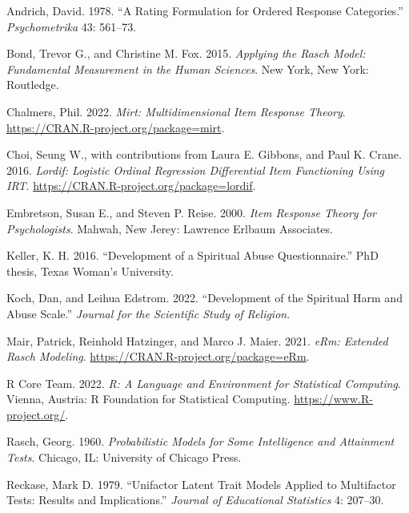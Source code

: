 \documentclass[
  letterpaper,
  DIV=11,
  numbers=noendperiod]{scrreport}
\newlength{\cslhangindent}
\newlength{\cslentryspacingunit} %
\newenvironment{CSLReferences}[2] %
 {%
  \setlength{\parindent}{0pt}
  \ifodd #1
  \let\oldpar\par
  \def\par{\hangindent=\cslhangindent\oldpar}
  \fi
  \setlength{\parskip}{#2\cslentryspacingunit}
 }%
 {}
\begin{document}
\hypertarget{refs}{}
\begin{CSLReferences}{1}{0}
\leavevmode{}%
Andrich, David. 1978. {``A Rating Formulation for Ordered Response
Categories.''} \emph{Psychometrika} 43: 561--73.

\leavevmode{}%
Bond, Trevor G., and Christine M. Fox. 2015. \emph{Applying the Rasch
Model: Fundamental Measurement in the Human Sciences}. New York, New
York: Routledge.

\leavevmode{}%
Chalmers, Phil. 2022. \emph{Mirt: Multidimensional Item Response
Theory}. \url{https://CRAN.R-project.org/package=mirt}.

\leavevmode{}%
Choi, Seung W., with contributions from Laura E. Gibbons, and Paul K.
Crane. 2016. \emph{Lordif: Logistic Ordinal Regression Differential Item
Functioning Using IRT}. \url{https://CRAN.R-project.org/package=lordif}.

\leavevmode{}%
Embretson, Susan E., and Steven P. Reise. 2000. \emph{Item Response
Theory for Psychologists}. Mahwah, New Jerey: Lawrence Erlbaum
Associates.

\leavevmode{}%
Keller, K. H. 2016. {``Development of a Spiritual Abuse
Questionnaire.''} PhD thesis, Texas Woman's University.

\leavevmode{}%
Koch, Dan, and Leihua Edstrom. 2022. {``Development of the Spiritual
Harm and Abuse Scale.''} \emph{Journal for the Scientific Study of
Religion}.

\leavevmode{}%
Mair, Patrick, Reinhold Hatzinger, and Marco J. Maier. 2021. \emph{eRm:
Extended Rasch Modeling}. \url{https://CRAN.R-project.org/package=eRm}.

\leavevmode{}%
R Core Team. 2022. \emph{R: A Language and Environment for Statistical
Computing}. Vienna, Austria: R Foundation for Statistical Computing.
\url{https://www.R-project.org/}.

\leavevmode{}%
Rasch, Georg. 1960. \emph{Probabilistic Models for Some Intelligence and
Attainment Tests}. Chicago, IL: University of Chicago Press.

\leavevmode{}%
Reckase, Mark D. 1979. {``Unifactor Latent Trait Models Applied to
Multifactor Tests: Results and Implications.''} \emph{Journal of
Educational Statistics} 4: 207--30.


\end{CSLReferences}
\end{document}
